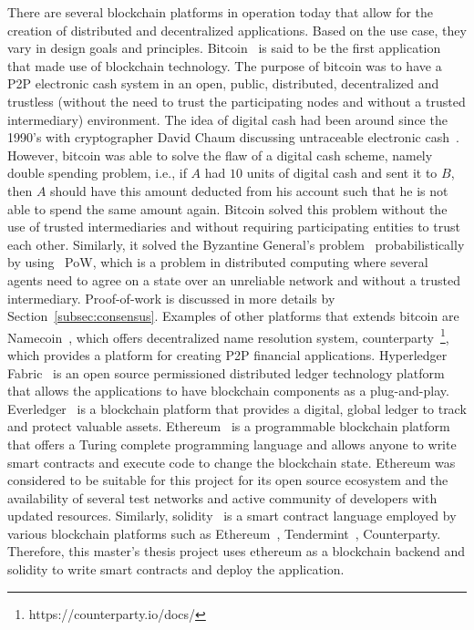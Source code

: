 There are several blockchain platforms in operation today that allow for the
creation of distributed and decentralized applications. Based on the use case,
they vary in design goals and principles. Bitcoin~\cite{Bitcoin_Satoshi} is
said to be the first application that made use of blockchain technology. The
purpose of bitcoin was to have a P2P electronic cash system in an open, public,
distributed, decentralized and trustless (without the need to trust the
participating nodes and without a trusted intermediary) environment. The idea
of digital cash had been around since the 1990's with cryptographer David Chaum
discussing untraceable electronic cash~\cite{chaum1988untraceable}. However,
bitcoin was able to solve the flaw of a digital cash scheme, namely double
spending problem, i.e., if $A$ had $10$ units of digital cash and sent it to
$B$, then $A$ should have this amount deducted from his account such that he is
not able to spend the same amount again. Bitcoin solved this problem without
the use of trusted intermediaries and without requiring participating entities
to trust each other. Similarly, it solved the Byzantine General's
problem~\cite{lamport1982byzantine,miller2014anonymous} probabilistically by
using ~\ac{PoW}, which is a problem in distributed computing where several
agents need to agree on a state over an unreliable network and without a
trusted intermediary. Proof-of-work is discussed in more details by
Section~\ref{subsec:consensus}. Examples of other platforms that extends
bitcoin are Namecoin~\cite{kalodner2015empirical}, which offers decentralized
name resolution system, counterparty~\footnote{https://counterparty.io/docs/},
which provides a platform for creating P2P financial applications. Hyperledger
Fabric~\cite{cachin2016architecture} is an open source permissioned distributed
ledger technology platform that allows the applications to have blockchain
components as a plug-and-play.  Everledger~\cite{lomas2015everledger} is a
blockchain platform that provides a digital, global ledger to track and protect
valuable assets. Ethereum~\cite{wood2014ethereum} is a programmable blockchain
platform that offers a Turing complete programming language and allows anyone
to write smart contracts and execute code to change the blockchain state.
Ethereum was considered to be suitable for this project for its open source
ecosystem and the availability of several test networks and active community of
developers with updated resources. Similarly, solidity~\cite{SolidityDocs} is a
smart contract language employed by various blockchain platforms such as
Ethereum~\cite{wood2014ethereum}, Tendermint~\cite{TendermintDocs},
Counterparty. Therefore, this master's thesis project uses ethereum as a
blockchain backend and solidity to write smart contracts and deploy the
application.  



